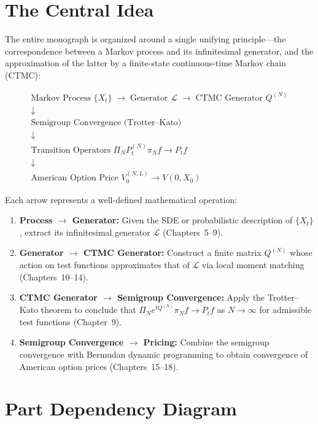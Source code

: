 \documentclass[11pt,a4paper,openany]{book}
\theoremstyle{definition}
\theoremstyle{plain}
\theoremstyle{remark}
\newcommand{\1}{\mathbbm{1}}
\begin{document}
\section{The Central Idea}

The entire monograph is organized around a single unifying principle---the correspondence between a Markov process and its infinitesimal generator, and the approximation of the latter by a finite-state continuous-time Markov chain (CTMC):

\[
\boxed{\begin{array}{c}
\text{Markov Process } \{X_{t}\} \;\longrightarrow\; \text{Generator } \mathcal{L} \;\longrightarrow\; \text{CTMC Generator } Q^{(N)} \\
\downarrow \\
\text{Semigroup Convergence (Trotter--Kato)} \\
\downarrow \\
\text{Transition Operators } \Pi_N P_{t}^{(N)}\pi_N f \to P_t f \\
\downarrow \\
\text{American Option Price } V_{0}^{(N,L)} \to V(0,X_{0})
\end{array}}
\]

\noindent Each arrow represents a well-defined mathematical operation:
\begin{enumerate}[label=(\arabic*)]
    \item \textbf{Process $\to$ Generator:} Given the SDE or probabilistic description of $\{X_{t}\}$, extract its infinitesimal generator $\mathcal{L}$ (Chapters~5--9).
    \item \textbf{Generator $\to$ CTMC Generator:} Construct a finite matrix $Q^{(N)}$ whose action on test functions approximates that of $\mathcal{L}$ via local moment matching (Chapters~10--14).
    \item \textbf{CTMC Generator $\to$ Semigroup Convergence:} Apply the Trotter--Kato theorem to conclude that $\Pi_N e^{tQ^{(N)}}\pi_N f \to P_{t}f$ as $N \to \infty$ for admissible test functions (Chapter~9).
    \item \textbf{Semigroup Convergence $\to$ Pricing:} Combine the semigroup convergence with Bermudan dynamic programming to obtain convergence of American option prices (Chapters~15--18).
\end{enumerate}

\section{Part Dependency Diagram}
\end{document}
